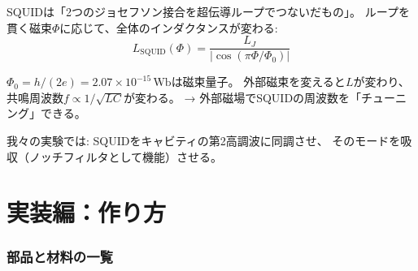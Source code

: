 \documentclass[12pt,a4paper]{article}
\begin{document}
\begin{theorybox}
SQUIDは「2つのジョセフソン接合を超伝導ループでつないだもの」。
ループを貫く磁束$\Phi$に応じて、全体のインダクタンスが変わる:
$$L_{\mathrm{SQUID}}(\Phi) = \frac{L_J}{|\cos(\pi\Phi/\Phi_0)|}$$

$\Phi_0 = h/(2e) = 2.07 \times 10^{-15}\,\mathrm{Wb}$は磁束量子。
外部磁束を変えると$L$が変わり、共鳴周波数$f \propto 1/\sqrt{LC}$が変わる。
→ 外部磁場でSQUIDの周波数を「チューニング」できる。

我々の実験では: SQUIDをキャビティの第2高調波に同調させ、
そのモードを吸収（ノッチフィルタとして機能）させる。
\end{theorybox}

\part{実装編：作り方}

\section{部品と材料の一覧}
\end{document}

